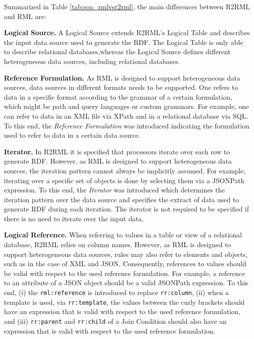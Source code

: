 \noindent Summarized in Table \ref{tab:soa_rmlvsr2rml}, the main differences between R2RML and RML are:

\noindent\textbf{{Logical Source.}} A Logical Source extends R2RML's Logical Table and describes the input data source used to generate the RDF. The Logical Table is only able to describe relational databases,whereas the Logical Source defines different heterogeneous data sources, including relational databases.

\noindent\textbf{{Reference Formulation.}} As RML is designed to support heterogeneous data sources, data sources in different formats needs to be supported. One refers to data in a specific format according to the grammar of a certain formulation, which might be path and query languages or custom grammars. For example, one can refer to data in an XML file via XPath and in a relational database via SQL. To this end, the \emph{Reference Formulation} was introduced indicating the formulation used to refer to data in a certain data source.

\noindent\textbf{{Iterator.}} In R2RML it is specified that processors iterate over each row to generate RDF. However, as RML is designed to support heterogeneous data sources, the iteration pattern cannot always be implicitly assumed. For example, iterating over a specific set of objects is done by selecting them via a JSONPath expression. To this end, the \emph{Iterator} was introduced which determines the iteration pattern over the data source and specifies the extract of data used to generate RDF during each iteration. The iterator is not required to be specified if there is no need to iterate over the input data.

\noindent\textbf{{Logical Reference.}} When referring to values in a table or view of a relational database, R2RML relies on column names. However, as RML is designed to support heterogeneous data sources, rules may also refer to elements and objects, such as in the case of XML and JSON. Consequently, references to values should be valid with respect to the used reference formulation. For example, a reference to an attribute of a JSON object should be a valid JSONPath expression. To this end, (i) the \verb|rml:reference| is introduced to replace \verb|rr:column|, (ii) when a template is used, via \verb|rr:template|, the values between the curly brackets should have an expression that is valid with respect to the used reference formulation, and (iii) \verb|rr:parent| and \verb|rr:child| of a Join Condition should also have an expression that is valid with respect to the used reference formulation.


